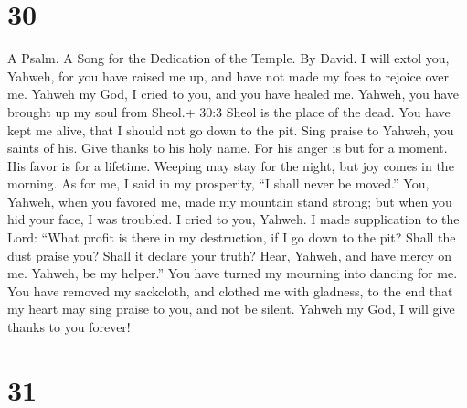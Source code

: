 \hypertarget{section-29}{%
\section{30}\label{section-29}}

A Psalm. A Song for the Dedication of the Temple. By David. 
I will extol you, Yahweh, for you have raised me up, and have not made
my foes to rejoice over me.  Yahweh my God, I cried to you,
and you have healed me.  Yahweh, you have brought up my soul
from Sheol.+ 30:3 Sheol is the place of the dead. You have kept me
alive, that I should not go down to the pit.  Sing praise to
Yahweh, you saints of his. Give thanks to his holy name. 
For his anger is but for a moment. His favor is for a lifetime. Weeping
may stay for the night, but joy comes in the morning.  As
for me, I said in my prosperity, ``I shall never be moved.''
 You, Yahweh, when you favored me, made my mountain stand
strong; but when you hid your face, I was troubled.  I cried
to you, Yahweh. I made supplication to the Lord:  ``What
profit is there in my destruction, if I go down to the pit? Shall the
dust praise you? Shall it declare your truth?  Hear,
Yahweh, and have mercy on me. Yahweh, be my helper.''  You
have turned my mourning into dancing for me. You have removed my
sackcloth, and clothed me with gladness,  to the end that
my heart may sing praise to you, and not be silent. Yahweh my God, I
will give thanks to you forever!

\hypertarget{section-30}{%
\section{31}\label{section-30}}

